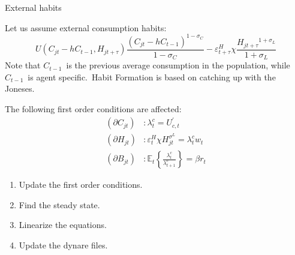 \documentclass[a4paper,12pt]{article}%
\begin{document}
\begin{myexercise}{External habits}
%


Let us assume external consumption habits:%
\[
U\left(  C_{jt}-hC_{t-1},H_{jt+\tau}\right)  \frac{\left(  C_{jt}%
-hC_{t-1}\right)  ^{1-\sigma_{C}}}{1-\sigma_{C}}-\varepsilon_{t+\tau}^{H}%
\chi\frac{H_{jt+\tau}{}^{1+\sigma_{L}}}{1+\sigma_{L}}%
\]
Note that $C_{t-1}$\ is the previous average consumption in the population,
while $C_{t-1}$\ is agent specific.\ Habit Formation is based on catching up
with the Joneses.

The following first order conditions are affected:%
\begin{align*}
\left(  \partial C_{jt}\right)   &  :\lambda_{t}^{c}=U_{c,t}^{\prime}\\
\left(  \partial H_{jt}\right)   &  :\varepsilon_{t}^{H}\chi H_{jt}%
^{\sigma^{L}}=\lambda_{t}^{c}w_{t}\\
\left(  \partial B_{jt}\right)   &  :\mathbb{E}_{t}\left\{  \frac{\lambda
_{t}^{c}}{\lambda_{t+1}^{c}}\right\}  =\beta r_{t}%
\end{align*}


\begin{enumerate}
\item Update the first order conditions.

\item Find the steady state.

\item Linearize the equations.

\item Update the dynare files.
\end{enumerate}%

\end{myexercise}%
%

\footnotesize

%
\normalsize
\end{document}
